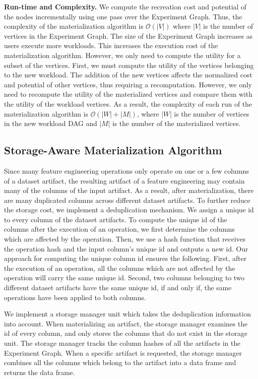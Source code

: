 \textbf{Run-time and Complexity.}
We compute the recreation cost and potential of the nodes incrementally using one pass over the Experiment Graph.
Thus, the complexity of the materialization algorithm is $\mathcal{O}(|V|)$ where $|V|$ is the number of vertices in the Experiment Graph.
The size of the Experiment Graph increases as users execute more workloads.
This increases the execution cost of the materialization algorithm.
However, we only need to compute the utility for a subset of the vertices. 
First, we must compute the utility of the vertices belonging to the new workload.
The addition of the new vertices affects the normalized cost and potential of other vertices, thus requiring a recomputation.
However, we only need to recompute the utility of the materialized vertices and compare them with the utility of the workload vertices.
As a result, the complexity of each run of the materialization algorithm is $\mathcal{O}(|W| + |M|)$, where $|W|$ is the number of vertices in the new workload DAG and $|M|$ is the number of the materialized vertices.

\subsection{Storage-Aware Materialization Algorithm}
Since many feature engineering operations only operate on one or a few columns of a dataset artifact, the resulting artifact of a feature engineering may contain many of the columns of the input artifact.
As a result, after materialization, there are many duplicated columns across different dataset artifacts.
To further reduce the storage cost, we implement a deduplication mechanism.
We assign a unique id to every column of the dataset artifacts.
To compute the unique id of the columns after the execution of an operation, we first determine the columns which are affected by the operation.
Then, we use a hash function that receives the operation hash and the input column's unique id and outputs a new id.
Our approach for computing the unique column id ensures the following.
First, after the execution of an operation, all the columns which are not affected by the operation will carry the same unique id.
Second, two columns belonging to two different dataset artifacts have the same unique id, if and only if, the same operations have been applied to both columns.

We implement a storage manager unit which takes the deduplication information into account.
When materializing an artifact, the storage manager examines the id of every column, and only stores the columns that do not exist in the storage unit.
The storage manager tracks the column hashes of all the artifacts in the Experiment Graph.
When a specific artifact is requested, the storage manager combines all the columns which belong to the artifact into a data frame and returns the data frame.

